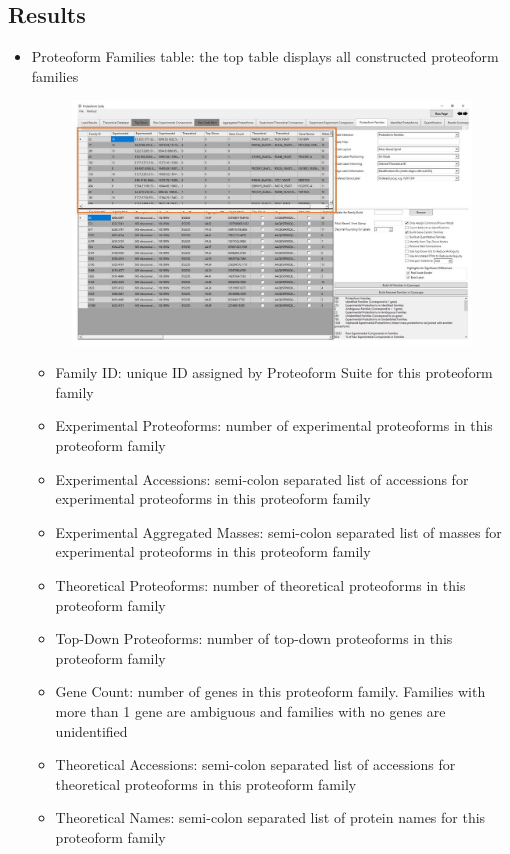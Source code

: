 \subsection{Results}
\begin{itemize}
	\item Proteoform Families table: the top table displays all constructed proteoform families
	\begin{figure}[h]
\centering
\includegraphics[scale=0.5]{figures/families2.jpg}
\end{figure}
\begin{itemize}
	\item Family ID: unique ID assigned by Proteoform Suite for this proteoform family
	\item Experimental Proteoforms: number of experimental proteoforms in this proteoform family
	\item Experimental Accessions: semi-colon separated list of accessions for experimental proteoforms in this proteoform family
	\item Experimental Aggregated Masses: semi-colon separated list of masses for experimental proteoforms in this proteoform family
	\item Theoretical Proteoforms: number of theoretical proteoforms in this proteoform family
	\item Top-Down Proteoforms: number of top-down proteoforms in this proteoform family
	\item Gene Count: number of genes in this proteoform family. Families with more than 1 gene are ambiguous and families with no genes are unidentified
	\item Theoretical Accessions: semi-colon separated list of accessions for theoretical proteoforms in this proteoform family
	\item Theoretical Names: semi-colon separated list of protein names for this proteoform family

\end{itemize}
\end{itemize}
